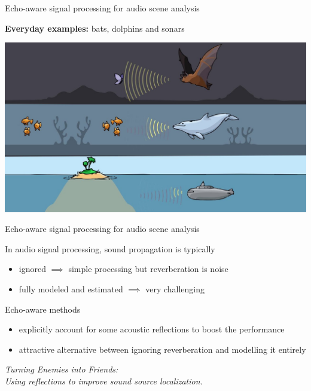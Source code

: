 \begin{frame}[t]{\alert{Echo-aware} signal processing for audio scene analysis}

    \textbf{Everyday examples:} bats, dolphins and sonars

    \begin{center}
        \includegraphics[width=\textwidth]{figures/echo_nature.jpg}
    \end{center}

\end{frame}

\begin{frame}{\alert{Echo-aware} signal processing for audio scene analysis}


    \begin{block}{}
        In audio signal processing, sound propagation is typically
        \begin{itemize}
            \item \alert{ignored} $\implies$ simple processing but reverberation is noise
            \item \alert{fully modeled} and estimated $\implies$ very challenging
        \end{itemize}
    \end{block}

    \pause
    \begin{mydefblock}{Echo-aware methods}
        \begin{itemize}
            \item explicitly account for some acoustic reflections to boost the performance
            \item attractive alternative between ignoring reverberation and modelling it entirely
        \end{itemize}
        \begin{center}
            \textit{Turning Enemies into Friends:
            \\Using reflections to improve sound source localization.}
        \end{center}
        \hfill \cite{ribeiro2010turning}
    \end{mydefblock}



\end{frame}

